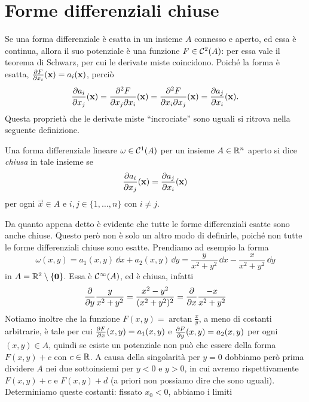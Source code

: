 \section{Forme differenziali chiuse}
Se una forma differenziale è esatta in un insieme $A$ connesso e aperto, ed essa è continua, allora il suo potenziale è una funzione $F\in\mathcal{C}^{{2}}(A)$: per essa vale il teorema di Schwarz, per cui le derivate miste coincidono.
Poiché la forma è esatta, $\frac{\partial {F}}{\partial {x_i}}(\mathbf{x})=a_i(\mathbf{x})$, perciò
\begin{equation}
	\frac{\partial {a_i}}{\partial {x_j}}(\mathbf{x})=\frac{\partial^2 F}{\partial x_j\partial x_i}(\mathbf{x})=\frac{\partial^2 F}{\partial x_i\partial x_j}(\mathbf{x})=\frac{\partial {a_j}}{\partial {x_i}}(\mathbf{x}).
\end{equation}
Questa proprietà che le derivate miste ``incrociate'' sono uguali si ritrova nella seguente definizione.
\begin{definizione} \label{d:forma-diff-chiusa}
	Una forma differenziale lineare $\omega\in\mathcal{C}^{{1}}(A)$ per un insieme $A\in\mathbb{R}^n$ aperto si dice \emph{chiusa} in tale insieme se
	\begin{equation}
		\frac{\partial {a_i}}{\partial {x_j}}(\mathbf{x})=\frac{\partial {a_j}}{\partial {x_i}}(\mathbf{x})
	\end{equation}
	per ogni $\vec x\in A$ e $i,j\in\{1,\dots,n\}$ con $i\neq j$.
\end{definizione}
Da quanto appena detto è evidente che tutte le forme differenziali esatte sono anche chiuse.
Questo però non è solo un altro modo di definirle, poiché non tutte le forme differenziali chiuse sono esatte.
Prendiamo ad esempio la forma
\begin{equation*}
	\omega(x,y)=a_1(x,y)\,\dd x+a_2(x,y)\,\dd y=\frac{y}{x^2+y^2}\,\dd x-\frac{x}{x^2+y^2}\,\dd y
\end{equation*}
in $A=\mathbb{R}^2\setminus\{\mathbf{0}\}$.
Essa è $\mathcal{C}^{{\infty}}(A)$, ed è chiusa, infatti
\begin{equation}
	\frac{\partial {}}{\partial {y}}\frac{y}{x^2+y^2}=\frac{x^2-y^2}{(x^2+y^2)^2}=\frac{\partial {}}{\partial {x}}\frac{-x}{x^2+y^2}
\end{equation}
Notiamo inoltre che la funzione $F(x,y)=\arctan\frac{x}{y}$, a meno di costanti arbitrarie, è tale per cui $\frac{\partial {F}}{\partial {x}}(x,y)=a_1(x,y)$ e $\frac{\partial {F}}{\partial {y}}(x,y)=a_2(x,y)$ per ogni $(x,y)\in A$, quindi se esiste un potenziale non può che essere della forma $F(x,y)+c$ con $c\in\mathbb{R}$.
A causa della singolarità per $y=0$ dobbiamo però prima dividere $A$ nei due sottoinsiemi per $y<0$ e $y>0$, in cui avremo rispettivamente $F(x,y)+c$ e $F(x,y)+d$ (a priori non possiamo dire che sono uguali).
Determiniamo queste costanti: fissato $x_0<0$, abbiamo i limiti
